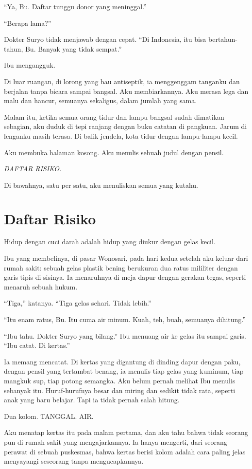 \documentclass[11pt,twoside,openany]{book}
\begin{document}
``Ya, Bu. Daftar tunggu donor yang meninggal.''

``Berapa lama?''

Dokter Suryo tidak menjawab dengan cepat. ``Di Indonesia, itu bisa bertahun-tahun, Bu. Banyak yang tidak sempat.''

Ibu mengangguk.

Di luar ruangan, di lorong yang bau antiseptik, ia menggenggam tanganku dan berjalan tanpa bicara sampai bangsal. Aku membiarkannya. Aku merasa lega dan malu dan hancur, semuanya sekaligus, dalam jumlah yang sama.

Malam itu, ketika semua orang tidur dan lampu bangsal sudah dimatikan sebagian, aku duduk di tepi ranjang dengan buku catatan di pangkuan. Jarum di lenganku masih terasa. Di balik jendela, kota tidur dengan lampu-lampu kecil.

Aku membuka halaman kosong. Aku menulis sebuah judul dengan pensil.

\emph{DAFTAR RISIKO.}

Di bawahnya, satu per satu, aku menuliskan semua yang kutahu.

\chapter{Daftar Risiko}
Hidup dengan cuci darah adalah hidup yang diukur dengan gelas kecil.

Ibu yang membelinya, di pasar Wonosari, pada hari kedua setelah aku keluar dari rumah sakit: sebuah gelas plastik bening berukuran dua ratus mililiter dengan garis tipis di sisinya. Ia menaruhnya di meja dapur dengan gerakan tegas, seperti menaruh sebuah hukum.

``Tiga,'' katanya. ``Tiga gelas sehari. Tidak lebih.''

``Itu enam ratus, Bu. Itu cuma air minum. Kuah, teh, buah, semuanya dihitung.''

``Ibu tahu. Dokter Suryo yang bilang.'' Ibu menuang air ke gelas itu sampai garis. ``Ibu catat. Di kertas.''

Ia memang mencatat. Di kertas yang digantung di dinding dapur dengan paku, dengan pensil yang tertambat benang, ia menulis tiap gelas yang kuminum, tiap mangkuk sup, tiap potong semangka. Aku belum pernah melihat Ibu menulis sebanyak itu. Huruf-hurufnya besar dan miring dan sedikit tidak rata, seperti anak yang baru belajar. Tapi ia tidak pernah salah hitung.

Dua kolom. TANGGAL. AIR.

Aku menatap kertas itu pada malam pertama, dan aku tahu bahwa tidak seorang pun di rumah sakit yang mengajarkannya. Ia hanya mengerti, dari seorang perawat di sebuah puskesmas, bahwa kertas berisi kolom adalah cara paling jelas menyayangi seseorang tanpa mengucapkannya.
\end{document}
